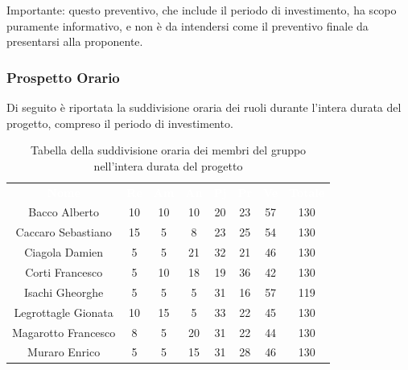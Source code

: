 Importante: questo preventivo, che include il periodo di investimento, ha scopo puramente informativo, e non è da intendersi come il preventivo finale da presentarsi alla proponente.
\subsubsection{Prospetto Orario}
Di seguito è riportata la suddivisione oraria dei ruoli durante l'intera durata del progetto, compreso il periodo di investimento.




\begin{table}[H]	
	\begin{center}
	    \begin{tabular}{cccccccc}
			\rowcolor{greySWEight}
			\textcolor{white}{\textbf{Nome}} & \textcolor{white}{\textbf{Re}} & \textcolor{white}{\textbf{Am}} & \textcolor{white}{\textbf{An}} & \textcolor{white}{\textbf{Pj}} & \textcolor{white}{\textbf{Pr}} & \textcolor{white}{\textbf{Ve}} & \textcolor{white}{\textbf{Totale}}
			\\
			Bacco Alberto & 10 & 10 & 10 & 20 & 23 & 57 & 130 \\
			Caccaro Sebastiano & 15 & 5 & 8 & 23 & 25 & 54 & 130 \\
			Ciagola Damien & 5 & 5 & 21 & 32 & 21 & 46 & 130 \\
			Corti Francesco & 5 & 10 & 18 & 19 & 36 & 42 & 130 \\
			Isachi Gheorghe & 5 & 5 & 5 & 31 & 16 & 57 & 119 \\
			Legrottagle Gionata & 10 & 15 & 5 & 33 & 22 & 45 & 130 \\
			Magarotto Francesco & 8 & 5 & 20 & 31 & 22 & 44 & 130 \\
			Muraro Enrico & 5 & 5 & 15 & 31 & 28 & 46 & 130 \\
			\end{tabular}
	    \caption{Tabella della suddivisione oraria dei membri del gruppo nell'intera durata del progetto} \label{tab:tabellaProgInt} 
	\end{center}
\end{table}

